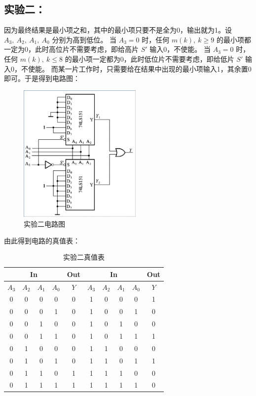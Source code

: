 \documentclass[a4paper,11pt,UTF8]{ctexart}
\begin{document}
 \subsection{实验二：\expb}
  \p 因为最终结果是最小项之和，其中的最小项只要不是全为0，输出就为1。设 $A_3,\ A_2,\ A_1,\ A_0$ 分别为高到低位。
  \p 当 $A_3=0$ 时，任何 $m(k),\ k\geqslant 9$ 的最小项都一定为0，此时高位片不需要考虑，即给高片 $S'$ 输入0，不使能。
  \p 当 $A_3=0$ 时，任何 $m(k),\ k\leqslant 8$ 的最小项一定都为0，此时低位片不需要考虑，即给低片 $S'$ 输入0，不使能。
  \p 而某一片工作时，只需要给在结果中出现的最小项输入1，其余置0即可。于是得到电路图：
  \begin{figure}[H]
   \centering
   \includegraphics[width=6cm]{Exp02}
   \caption{实验二电路图}
   \label{fig:Exp02}
  \end{figure}
  \p 由此得到电路的真值表：
  \begin{table}[H]
   \centering
   \begin{tabular}{|cccc|c|cccc|c|}\hline
    \multicolumn{4}{|c|}{In} &Out 
    &\multicolumn{4}{|c|}{In} &Out
    \\\hline
    $A_3$ &$A_2$ &$A_1$ &$A_0$ &$Y$ &
    $A_3$ &$A_2$ &$A_1$ &$A_0$ &$Y$
    \\\hline
    0 &0 &0 &0	&0 &
    1 &0 &0 &0	&1\\
    0 &0 &0 &1	&0 &
    1 &0 &0 &1	&0\\
    0 &0 &1 &0	&0 &
    1 &0 &1 &0	&0\\
    0 &0 &1 &1	&0 &
    1 &0 &1 &1	&1\\
    0 &1 &0 &0	&0 &
    1 &1 &0 &0	&0\\
    0 &1 &0 &1	&0 &
    1 &1 &0 &1	&1\\
    0 &1 &1 &0	&1 &
    1 &1 &1 &0	&0\\
    0 &1 &1 &1	&1 &
    1 &1 &1 &1	&0
    \\\hline
   \end{tabular}
   \caption{实验二真值表}
   \label{tab:Exp02}
  \end{table}
  
\end{document}

